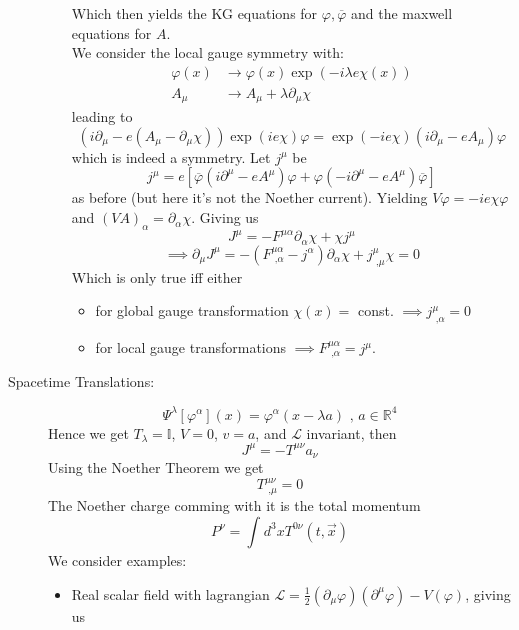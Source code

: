 \documentclass{report}
\begin{document}
\begin{description}
\begin{itemize}
\[  \] Which then yields the KG equations for $\varphi, \overline{\varphi} $ and the maxwell equations for $A$.\\
  We consider the local gauge symmetry with:
  \begin{align*}
    \varphi( x ) &\to \varphi( x ) \exp\left( -i\lambda e \chi(x) \right) \\
    A_\mu &\to  A_\mu + \lambda \partial_\mu \chi
  \end{align*} leading to \[
  \left( i \partial_\mu - e \left( A_\mu - \partial_\mu \chi \right)   \right) \exp\left( ie\chi \right) \varphi = 
  \exp\left( -ie\chi \right) \left( i \partial_\mu - e A_\mu  \right) \varphi
  \] which is indeed a symmetry. Let $j^{\mu} $ be \[
    j^{\mu} = e \left[ \overline{\varphi}\left( i\partial^{\mu} - eA^{\mu} \right) \varphi  + \varphi\left( -i\partial^{\mu} - eA^{\mu} \right) \overline{\varphi}  \right] 
  \] as before (but here it's not the Noether current). Yielding $V\varphi = -ie\chi \varphi$ and $\left( VA \right)_\alpha = \partial_\alpha \chi$. Giving us \[
  J^{\mu} = - F^{\mu \alpha} \partial_\alpha \chi + \chi j^{\mu}  
  \] \[
  \implies \partial_\mu J^{\mu} = - \left( F^{\mu\alpha}_{\text{ ,}\alpha} - j^{\alpha} \right) \partial_\alpha \chi + j^{\mu}_{\text{ ,}\mu} \chi = 0 
  \] Which is only true iff either 
    \begin{itemize}
      \item for global gauge transformation $\chi( x )= $ const. $\implies j^{\mu}_{\text{ ,}\alpha} =0$
      \item for local gauge transformations $\implies F^{\mu\alpha}_{\text{ ,}\alpha} = j^{\mu} $.
    \end{itemize}
  \end{itemize}
  \item[Spacetime Translations:] \[
  \Psi^{\lambda} \left[ \varphi^{\alpha}  \right] \left( x \right) = \varphi^{\alpha} \left( x - \lambda a \right) \text{ , } a \in \mathbb{R}^{4} 
  \] Hence we get $T_\lambda = \mathbb{I}$, $V = 0$, $v = a$, and $\mathcal{L} $ invariant, then \[
  J^{\mu} = - T^{\mu \nu} a_\nu
  \] Using the Noether Theorem we get \[
  T^{\mu\nu}_{\text{  ,}\mu} = 0
  \] The Noether charge comming with it is the total momentum \[
  P^{\nu}  = \int_{}^{} d^3x T^{0\nu} \left( t,\vec{x} \right)  
  \] 
  We consider examples:
  \begin{itemize}
    \item Real scalar field with lagrangian $\mathcal{L} = \frac{1}{2} \left( \partial_\mu \varphi \right) \left( \partial^{\mu} \varphi  \right) - V\left( \varphi \right)  $, giving us \[
\]
\end{itemize}
\end{description}
\end{document}
